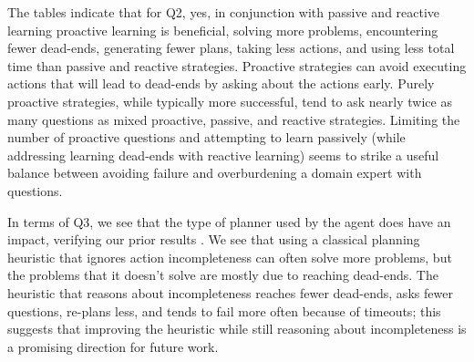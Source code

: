 \documentclass[letterpaper]{article}
\def\citep#1{\cite{#1}}
\begin{document}

The tables indicate that for Q2, yes, in conjunction with passive and reactive
learning proactive learning is beneficial, solving more problems, encountering fewer
dead-ends, generating fewer plans, taking less actions, and using less total
time than passive and reactive strategies.  Proactive strategies can avoid
executing actions that will lead to dead-ends by asking about the actions early.
Purely proactive strategies, while typically more successful, tend to ask nearly
twice as many questions as mixed proactive, passive, and reactive strategies. 
Limiting the number of proactive questions and attempting to learn passively
(while addressing learning dead-ends with reactive learning) seems to strike a
useful balance between avoiding failure and overburdening a domain expert with
questions.

In terms of Q3, we see that the type of planner used by the agent does have an
impact, verifying our prior results \citep{bryce-icaps11}.  We see that using a
classical planning heuristic that ignores action incompleteness can often solve
more problems, but the problems that it doesn't solve are mostly due to reaching
dead-ends.  The heuristic that reasons about incompleteness reaches fewer
dead-ends, asks fewer questions, re-plans less, and tends to fail more often
because of timeouts; this suggests that improving the heuristic while still
reasoning about incompleteness is a promising direction for future work.
\end{document}
